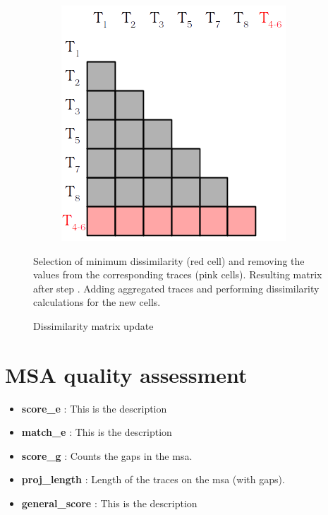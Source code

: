 \documentclass[12pt,a4paper]{article}
\begin{document}
\begin{figure}[H]
\begin{subfigure}[t]{0.33\linewidth}
		\includegraphics[width=0.7\linewidth]{img/matrix3.png}
		\caption{}
		\label{sub:matrix3}
	\end{subfigure}
	\caption{Dissimilarity matrix update}{
		\emph{\color{blue}{(a)}} Selection of minimum dissimilarity (red cell) and removing the values from the corresponding traces (pink cells).
		\emph{\color{blue}{(b)}} Resulting matrix after step \emph{\color{blue}{a}}.
		\emph{\color{blue}{(c)}} Adding aggregated traces and performing dissimilarity calculations for the new cells.
	}
	\label{fig:matrix}
\end{figure}




\section{MSA quality assessment}


\begin{itemize}
	\item \textbf{score\_e} : This is the description
	\item \textbf{match\_e} : This is the description
	\item \textbf{score\_g} : Counts the gaps in the msa.
	\item \textbf{proj\_length} : Length of the traces on the msa (with gaps).
	\item \textbf{general\_score} : This is the description
\end{itemize}
\end{document}
